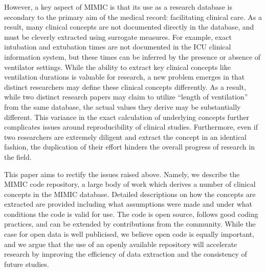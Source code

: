 \documentclass{elsart}
\begin{document}
However, a key aspect of MIMIC is that its use as a research database is secondary to the primary aim of the medical record: facilitating clinical care. As a result, many clinical concepts are not documented directly in the database, and must be cleverly extracted using surrogate measures. For example, exact intubation and extubation times are not documented in the ICU clinical information system, but these times can be inferred by the presence or absence of ventilator settings. While the ability to extract key clinical concepts like ventilation durations is valuable for research, a new problem emerges in that distinct researchers may define these clinical concepts differently.
As a result, while two distinct research papers may claim to utilize ``length of ventilation'' from the same database, the actual values they derive may be substantially different. This variance in the exact calculation of underlying concepts further complicates issues around reproducibility of clinical studies.
Furthermore, even if two researchers are extremely diligent and extract the concept in an identical fashion, the duplication of their effort hinders the overall progress of research in the field.



This paper aims to rectify the issues raised above. Namely, we describe the MIMIC code repository, a large body of work which derives a number of clinical concepts in the MIMIC database.
Detailed descriptions on how the concepts are extracted are provided including what assumptions were made and under what conditions the code is valid for use. The code is open source, follows good coding practices, and can be extended by contributions from the community.
While the case for open data is well publicised, we believe open code is equally important, and we argue that the use of an openly available repository will accelerate research by improving the efficiency of data extraction and the consistency of future studies.
\end{document}
